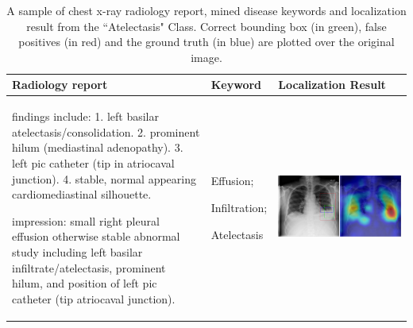 \documentclass[10pt,twocolumn,letterpaper]{article}
\begin{document}
\begin{table}
	\begin{center}
		\begin{tabular}{p{15em}|p{6em}|p{23em}}
			\hline
			Radiology report & Keyword & Localization Result\\
			\hline\hline
			findings include: 1. left basilar atelectasis/consolidation. 2. prominent hilum (mediastinal adenopathy). 3. left pic catheter (tip in atriocaval junction). 4. stable, normal appearing cardiomediastinal silhouette. 
			
			impression: small right pleural effusion otherwise stable abnormal study including left basilar infiltrate/atelectasis, prominent hilum, and position of left pic catheter (tip atriocaval junction).
			& Effusion;
			
			Infiltration;
			
			Atelectasis 
			&\vspace{0cm}\includegraphics[width=1\linewidth]{00102881_01_c_1.png} \\
			\hline
		\end{tabular}
	\end{center}
	\caption{A sample of chest x-ray radiology report, mined disease keywords and localization result from the ``Atelectasis" Class. Correct bounding box (in green), false positives (in red) and the ground truth (in blue) are plotted over the original image.}
	\label{tab:Loc_example_1}
\end{table}
\end{document}

